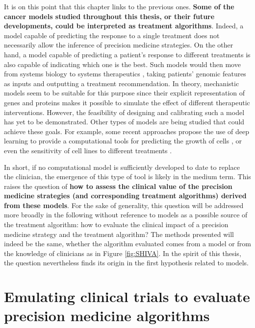 \documentclass[a4paper,12pt,twoside,onecolumn,openright,final,oldfontcommands]{memoir}
\begin{document}
It is on this point that this chapter links to the previous ones.
\textbf{Some of the cancer models studied throughout this thesis, or
their future developments, could be interpreted as treatment
algorithms}. Indeed, a model capable of predicting the response to a
single treatment does not necessarily allow the inference of precision
medicine strategies. On the other hand, a model capable of predicting a
patient's response to different treatments is also capable of indicating
which one is the best. Such models would then move from systems biology
to systems therapeutics \citep{hansen2013computation}, taking patients'
genomic features as inputs and outputting a treatment recommendation. In
theory, mechanistic models seem to be suitable for this purpose since
their explicit representation of genes and proteins makes it possible to
simulate the effect of different therapeutic interventions. However, the
feasibility of designing and calibrating such a model has yet to be
demonstrated. Other types of models are being studied that could achieve
these goals. For example, some recent approaches propose the use of deep
learning to provide a computational tools for predicting the growth of
cells \citep{ma2018using}, or even the sensitivity of cell lines to
different treatments \citep{manica2019toward}.

In short, if no computational model is sufficiently developed to date to
replace the clinician, the emergence of this type of tool is likely in
the medium term. This raises the question of \textbf{how to assess the
clinical value of the precision medicine strategies (and corresponding
treatment algorithms) derived from these models}. For the sake of
generality, this question will be addressed more broadly in the
following without reference to models as a possible source of the
treatment algorithm: how to evaluate the clinical impact of a precision
medicine strategy and the treatment algorithm? The methods presented
will indeed be the same, whether the algorithm evaluated comes from a
model or from the knowledge of clinicians as in Figure \ref{fig:SHIVA}.
In the spirit of this thesis, the question nevertheless finds its origin
in the first hypothesis related to models.

\section{Emulating clinical trials to evaluate precision medicine
algorithms}\label{emulating-clinical-trials-to-evaluate-precision-medicine-algorithms}
\end{document}
